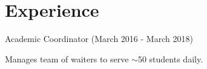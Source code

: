 \documentclass[letterpaper]{deedy-resume} %
\begin{document}
\begin{minipage}[t]{0.58\textwidth} %


\section{Experience}

\vspace{\topsep}
\begin{tightitemize}
\item Academic Coordinator (March 2016 - March 2018)
\end{tightitemize}

\sectionspace

\vspace{\topsep}
\begin{tightitemize}
\item Manages team of waiters to serve $\sim$50 students daily.
\end{tightitemize}

\sectionspace








\end{minipage}
\end{document}
